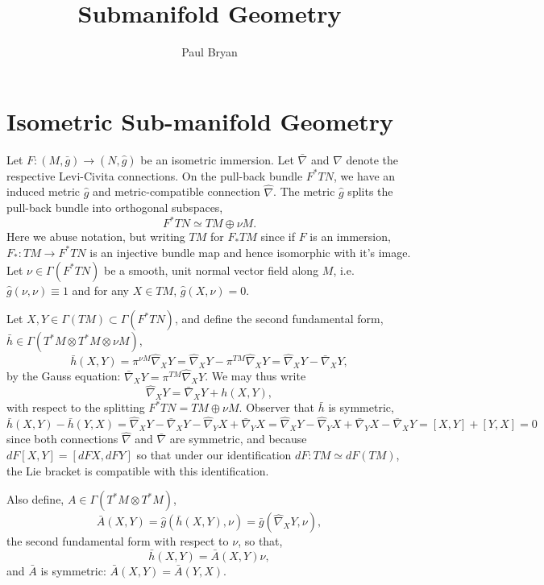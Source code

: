 \documentclass{article}
\title{Submanifold Geometry}
\author{Paul Bryan}
\begin{document}
\maketitle

\section{Isometric Sub-manifold Geometry}

Let $F: (M, \bar{g}) \to (N, \hat{g})$ be an isometric immersion. Let $\bar{\nabla}$ and $\hat{\nabla}$ denote the respective Levi-Civita connections. On the pull-back bundle $F^{\ast} TN$, we have an induced metric $\hat{g}$ and metric-compatible connection $\hat{\nabla}$. The metric $\hat{g}$ splits the  pull-back bundle into orthogonal subspaces,
\[
F^{\ast}TN \simeq TM \oplus \nu M.
\]
Here we abuse notation, but writing $TM$ for $F_{\ast} TM$ since if $F$ is an immersion, $F_{\ast} : TM \to F^{\ast} TN$ is an injective bundle map and hence isomorphic with it's image. Let $\nu \in \Gamma(F^{\ast}TN)$ be a smooth, unit normal vector field along $M$, i.e. $\hat{g}(\nu, \nu) \equiv 1$ and for any $X \in TM$, $\hat{g}(X, \nu) = 0$.

Let $X, Y \in \Gamma(TM) \subset \Gamma(F^{\ast}TN)$, and define the second fundamental form, $\bar{h} \in \Gamma(T^{\ast} M \otimes T^{\ast} M \otimes \nu M)$,
\[
\bar{h}(X, Y) = \pi^{\nu M} \hat{\nabla}_X Y = \hat{\nabla}_X Y - \pi^{TM} \hat{\nabla}_X Y = \hat{\nabla}_X Y - \bar{\nabla}_X Y,
\]
by the Gauss equation: $\bar{\nabla}_X Y = \pi^{TM} \hat{\nabla}_X Y$. We may thus write
\[
\hat{\nabla}_X Y = \bar{\nabla}_X Y + h(X, Y),
\]
with respect to the splitting $F^{\ast}TN = TM \oplus \nu M$. Observer that $\bar{h}$ is symmetric,
\[
\bar{h} (X, Y) - \bar{h} (Y, X) = \hat{\nabla}_X Y - \bar{\nabla}_X Y - \hat{\nabla}_Y X + \bar{\nabla}_Y X = \hat{\nabla}_X Y - \hat{\nabla}_Y X + \bar{\nabla}_Y X - \bar{\nabla}_X Y = [X, Y] + [Y, X] = 0
\]
since both connections $\hat{\nabla}$ and $\bar{\nabla}$ are symmetric, and because $dF [X, Y] = [dF X, dF Y]$ so that under our identification $dF : TM \simeq dF(TM)$, the Lie bracket is compatible with this identification.

Also define, $A \in \Gamma(T^{\ast}M \otimes T^{\ast} M)$,
\[
\bar{A}(X, Y) = \hat{g}(\bar{h}(X, Y), \nu) = \bar{g} (\hat{\nabla}_X Y, \nu),
\]
the second fundamental form with respect to $\nu$, so that,
\[
\bar{h}(X, Y) = \bar{A}(X, Y) \nu,
\]
and $\bar{A}$ is symmetric: $\bar{A}(X, Y) = \bar{A}(Y, X)$.
\end{document}
